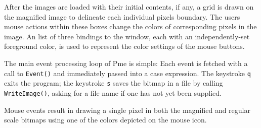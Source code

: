 
After the images are loaded with their initial contents, if any, a grid
is drawn on the magnified image to delineate each individual
pixel{\textquotesingle}s boundary. The user{\textquotesingle}s mouse
actions within these boxes change the colors of corresponding pixels in
the image. An list of three bindings to the window, each with an
independently-set foreground color, is used to represent the color
settings of the mouse buttons.


The main event processing loop of Pme is simple: Each event is fetched
with a call to \texttt{Event()} and immediately passed into a case
expression. The keystroke \texttt{{\textquotedbl}q{\textquotedbl}}
exits the program; the keystroke
\texttt{{\textquotedbl}s{\textquotedbl}} saves the bitmap in a file by
calling \texttt{WriteImage()}, asking for a file name if one has not
yet been supplied.


Mouse events result in drawing a single pixel in both the magnified and
regular scale bitmaps using one of the colors depicted on the mouse icon. 

